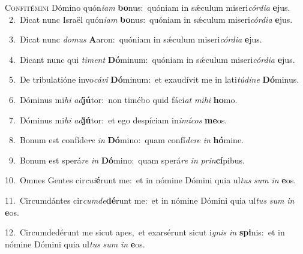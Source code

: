 \lettrine{\initial\textcolor{\initialcolor}{C}}{onfitémini} Dómino quón\-\textit{i}\-\textit{am} \textbf{bo}\-nus:~\star quóniam in sǽculum miseri\-\textit{cór}\-\textit{di}\textit{a} \textbf{e}\-jus.\\
{\numbfont\textcolor{\numbcolor}{~2.}}~Dicat nunc Israël quón\-\textit{i}\-\textit{am} \textbf{bo}\-nus:~\star quóniam in sǽculum miseri\-\textit{cór}\-\textit{di}\textit{a} \textbf{e}\-jus.\par
{\numbfont\textcolor{\numbcolor}{~3.}}~Dicat nunc \textit{do}\-\textit{mus} \textbf{A}\-aron:~\star quóniam in sǽculum miseri\-\textit{cór}\-\textit{di}\textit{a} \textbf{e}\-jus.\par
{\numbfont\textcolor{\numbcolor}{~4.}}~Dicant nunc qui \textit{ti}\-\textit{ment} \textbf{Dó}\-minum:~\star quóniam in sǽculum miseri\-\textit{cór}\-\textit{di}\textit{a} \textbf{e}\-jus.\par
{\numbfont\textcolor{\numbcolor}{~5.}}~De tribulatióne invo\-\textit{cá}\-\textit{vi} \textbf{Dó}\-minum:~\star et exaudívit me in lati\-\textit{tú}\-\textit{di}\textit{ne} \textbf{Dó}\-minus.\par
{\numbfont\textcolor{\numbcolor}{~6.}}~Dóminus mi\textit{hi} \textit{ad}\-\textbf{jú}tor:~\star non timébo quid fáci\textit{at} \textit{mi}\-\textit{hi} \textbf{ho}\-mo.\par
{\numbfont\textcolor{\numbcolor}{~7.}}~Dóminus mi\textit{hi} \textit{ad}\-\textbf{jú}tor:~\star et ego despíciam in\-\textit{i}\-\textit{mí}\textit{cos} \textbf{me}\-os.\par
{\numbfont\textcolor{\numbcolor}{~8.}}~Bonum est confíde\textit{re} \textit{in} \textbf{Dó}\-mino:~\star quam confí\-\textit{de}\-\textit{re} \textit{in} \textbf{hó}\-mine.\par
{\numbfont\textcolor{\numbcolor}{~9.}}~Bonum est sperá\textit{re} \textit{in} \textbf{Dó}\-mino:~\star quam sperá\textit{re} \textit{in} \textit{prin}\-\textbf{cí}pibus.\par
{\numbfont\textcolor{\numbcolor}{10.}}~Omnes Gentes cir\-\textit{cu}\-\textit{i}\textbf{é}runt me:~\star et in nómine Dómini quia ul\textit{tus} \textit{sum} \textit{in} \textbf{e}\-os.\par
{\numbfont\textcolor{\numbcolor}{11.}}~Circumdántes cir\-\textit{cum}\-\textit{de}\textbf{dé}runt me:~\star et in nómine Dómini quia ul\textit{tus} \textit{sum} \textit{in} \textbf{e}\-os.\par
{\numbfont\textcolor{\numbcolor}{12.}}~Circumdedérunt me sicut apes,~\dagger et exarsérunt sicut i\textit{gnis} \textit{in} \textbf{spi}\-nis:~\star et in nómine Dómini quia ul\textit{tus} \textit{sum} \textit{in} \textbf{e}\-os.\par
